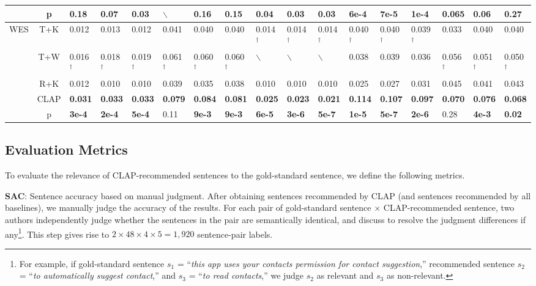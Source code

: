 \begin{table}[h]
\begin{center}
\begin{tabular}{|c|c||p{0.55cm}|p{0.55cm}|p{0.55cm}||p{0.55cm}|p{0.55cm}|p{0.55cm}||p{0.55cm}|p{0.55cm}|p{0.55cm}||p{0.55cm}|p{0.55cm}|p{0.55cm}||p{0.55cm}|p{0.55cm}|p{0.55cm}|}
 & p& 0.18 & 0.07 & \textbf{0.03} & $\backslash$ & 0.16 & 0.15 & \textbf{0.04} & \textbf{0.03} & \textbf{0.03} & \textbf{6e-4} & \textbf{7e-5} & \textbf{1e-4}  & 0.065 & 0.06 & 0.27\\\hline\hline
 \multirow{5}{*}{WES} & T+K& 0.012 & 0.013 & 0.012 & 0.041 & 0.040 & 0.040 & 0.014$^{\dagger}$ & 0.014$^{\dagger}$ & 0.014$^{\dagger}$ & 0.040$^{\dagger}$ & 0.040$^{\dagger}$ & 0.039$^{\dagger}$ & 0.033 & 0.040 & 0.040\\ \cline{2-17}
 & T+W & 0.016$^{\dagger}$ & 0.018$^{\dagger}$ & 0.019$^{\dagger}$ & 0.061$^{\dagger}$ & 0.060$^{\dagger}$ & 0.060$^{\dagger}$ & $\backslash$ & $\backslash$ & $\backslash$ & 0.038 & 0.039 & 0.036& 0.056$^{\dagger}$ & 0.051$^{\dagger}$ & 0.050$^{\dagger}$\\ \cline{2-17}
& R+K & 0.012 & 0.010 & 0.010 & 0.039 & 0.035 & 0.038 & 0.010 & 0.010 & 0.010 & 0.025 & 0.027 & 0.031 & 0.045 & 0.041 & 0.043 \\ \cline{2-17}
& CLAP & \textbf{0.031} & \textbf{0.033} & \textbf{0.033} & \textbf{0.079} & \textbf{0.084} & \textbf{0.081} & \textbf{0.025} & \textbf{0.023} & \textbf{0.021} & \textbf{0.114} & \textbf{0.107} & \textbf{0.097}& \textbf{0.070} & \textbf{0.076} & \textbf{0.068}\\ \cline{2-17}
& p& \textbf{3e-4} & \textbf{2e-4} & \textbf{5e-4} & 0.11 & \textbf{9e-3} & \textbf{9e-3} & \textbf{6e-5} & \textbf{3e-6} & \textbf{5e-7} & \textbf{1e-5}& \textbf{5e-7}& \textbf{2e-6} & 0.28 & \textbf{4e-3} & \textbf{0.02}\\ \hline
\end{tabular}
\end{center}
\vspace{-0.1in}
\end{table}

\subsection{Evaluation Metrics}
\label{sec:metric}

To evaluate the relevance of CLAP-recommended sentences to the gold-standard sentence, we define the following metrics. 

\textbf{SAC}: Sentence accuracy based on manual judgment. After obtaining sentences recommended by CLAP (and sentences recommended by all baselines), we manually judge the accuracy of the results. For each pair of gold-standard sentence $\times$ CLAP-recommended sentence, two authors independently judge whether the sentences in the pair are semantically identical, and discuss to resolve the judgment differences if any\footnote{For example, if gold-standard sentence $s_1$ = ``\emph{this app uses your contacts permission for contact suggestion},'' recommended sentence $s_2$ = ``\emph{to automatically suggest contact},'' and $s_3$ = ``\emph{to read contacts},'' we judge $s_2$ as relevant and $s_3$ as non-relevant.}. This step gives rise to $2\times 48\times 4\times 5 = 1,920$ sentence-pair labels. 

